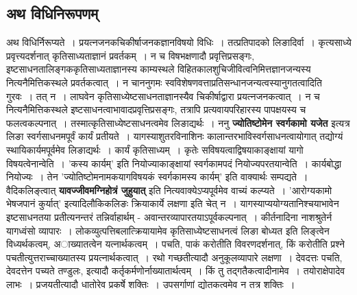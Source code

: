 \subsection*{अथ विधिनिरूपणम्}
		अथ विधिर्निरूप्यते~। प्रयत्नजनकचिकीर्षाजनकज्ञानविषयो विधिः~। तत्प्रतिपादको लिङादिर्वा~। कृत्यसाध्ये प्रवृत्त्यदर्शनात् कृतिसाध्यताज्ञानं प्रवर्तकम्~। न च विषभक्षणादौ प्रवृत्तिप्रसङ्गः, इष्टसाधनतालिङ्गककृतिसाध्यताज्ञानस्य काम्यस्थले विहितकालशुचिजीवित्वनिमित्तज्ञानजन्यस्य नित्यनैमित्तिकस्थले प्रवर्तकत्वात्~। न चाननुगमः स्वविशेषणवत्ताप्रतिसन्धानजन्यत्वस्यानुगतत्वादिति गुरवः~। तत् न~। लाघवेन कृतिसाध्येष्टसाधनताज्ञानस्यैव चिकीर्षाद्वारा प्रयत्नजनकत्वात्~। न च नित्यनैमित्तिकस्थले इष्टसाधनत्वाभावादप्रवृत्तिप्रसङ्गः, तत्रापि प्रत्यवायपरिहारस्य पापक्षयस्य च फलत्वकल्पनात्~। तस्मात्कृतिसाध्येष्टसाधनत्वमेव लिङाद्यर्थः~। ननु {\bfseries ज्योतिष्टोमेन स्वर्गकामो यजेत} इत्यत्र लिङा स्वर्गसाधनमपूर्वं कार्यं प्रतीयते~। यागस्याशुतरविनाशिनः कालान्तरभाविस्वर्गसाधनत्वायोगात् तद्योग्यं स्थायिकार्यमपूर्वमेव लिङाद्यर्थः~। कार्यं कृतिसाध्यम्~। कृतेः सविषयत्वाद्विषयाकाङ्क्षायां यागो विषयत्वेनान्वेति~। ’कस्य कार्यम्’ इति नियोज्याकाङ्क्षायां स्वर्गकामपदं नियोज्यपरतयान्वेति~। कार्यबोद्धा नियोज्यः~। तेन ’ज्योतिष्टोमनामकयागविषयकं स्वर्गकामस्य कार्यम्’ इति वाक्यार्थः सम्पद्यते~। वैदिकलिङ्त्वात् {\bfseries यावज्जीवमग्निहोत्रं जुहुयात्} इति नित्यवाक्येऽप्यपूर्वमेव वाच्यं कल्प्यते~। ’आरोग्यकामो भेषजपानं कुर्यात्’ इत्यादिलौकिकलिङः क्रियाकार्ये लक्षणा इति चेत् न~। यागस्याप्ययोग्यतानिश्चयाभावेन इष्टसाधनतया प्रतीत्यनन्तरं तन्निर्वाहार्थम् - अवान्तरव्यापारतयाऽपूर्वकल्पनात्~। कीर्तनादिना नाशश्रुतेर्न यागध्वंसो व्यापारः~। लोकव्युत्पत्तिबलात्क्रियायामेव कृतिसाध्येष्टसाधनत्वं लिङा बोध्यत इति लिङ्त्वेन विध्यर्थकत्वम्, अाख्यातत्वेन यत्नार्थकत्वम्~। पचति, पाकं करोतीति विवरणदर्शनात्, किं करोतीति प्रश्ने पचतीत्युत्तराच्चाख्यातस्य प्रयत्नार्थकत्वात्~। रथो गच्छतीत्यादौ अनुकूलव्यापारे लक्षणा~। देवदत्तः पचति, देवदत्तेन पच्यते तण्डुलः, इत्यादौ कर्तृकर्मणोर्नाख्यातार्थत्वम्~। किं तु तद्गतैकत्वादीनामेव~। तयोराक्षेपादेव लाभः~। प्रजयतीत्यादौ धातोरेव प्रकर्षे शक्तिः~। उपसर्गाणां द्योतकत्वमेव न तत्र शक्तिः~।
